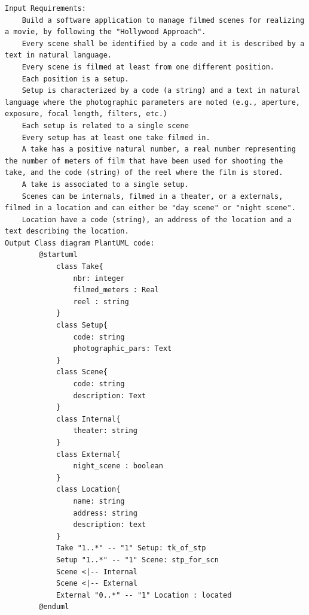 \begin{lstlisting}[caption={Few-shot prompt}, label={lst:Few_shot},basicstyle=\ttfamily\tiny]
Input Requirements: 
    Build a software application to manage filmed scenes for realizing a movie, by following the "Hollywood Approach".
    Every scene shall be identified by a code and it is described by a text in natural language.
    Every scene is filmed at least from one different position.
    Each position is a setup.
    Setup is characterized by a code (a string) and a text in natural language where the photographic parameters are noted (e.g., aperture, exposure, focal length, filters, etc.)
    Each setup is related to a single scene 
    Every setup has at least one take filmed in.
    A take has a positive natural number, a real number representing the number of meters of film that have been used for shooting the take, and the code (string) of the reel where the film is stored.
    A take is associated to a single setup.
    Scenes can be internals, filmed in a theater, or a externals, filmed in a location and can either be "day scene" or "night scene".
    Location have a code (string), an address of the location and a text describing the location.
Output Class diagram PlantUML code:
        @startuml
            class Take{
                nbr: integer
                filmed_meters : Real
                reel : string
            }
            class Setup{
                code: string
                photographic_pars: Text
            }
            class Scene{
                code: string
                description: Text
            }
            class Internal{
                theater: string
            }
            class External{
                night_scene : boolean
            }
            class Location{
                name: string
                address: string
                description: text
            }
            Take "1..*" -- "1" Setup: tk_of_stp
            Setup "1..*" -- "1" Scene: stp_for_scn
            Scene <|-- Internal
            Scene <|-- External
            External "0..*" -- "1" Location : located
        @enduml


\end{lstlisting}
